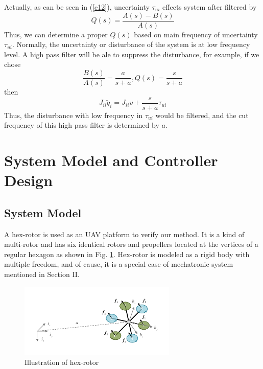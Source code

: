 \documentclass[letterpaper, 10 pt, conference]{ieeeconf}  %
\begin{document}
Actually, as can be seen in (\ref{e12}), uncertainty $\tau_{ui}$ effects system after filtered by
\begin{equation}
    Q(s) = \frac{A(s)-B(s)}{A(s)} 
    \label{e13}
\end{equation}
Thus, we can determine a proper $Q(s)$ based on main frequency of uncertainty $\tau_{ui}$.
Normally, the uncertainty or disturbance of the system is at low frequency level.
A high pass filter will be ale to suppress the disturbance, for example, if we chose
\begin{equation}
    \frac{B(s)}{A(s)} = \frac{a}{s+a}, Q(s) = \frac{s}{s+a} \label{e14}
\end{equation}
then
\begin{equation}
    J_{ii}\ddot{q}_i = J_{ii}v + \frac{s}{s+a}\tau_{ui} \label{e15}
\end{equation}
Thus, the disturbance with low frequency in $\tau_{ui}$ would be filtered, and the cut frequency of this high pass filter is determined by $a$.

\section{System Model and Controller Design}

\subsection{System Model}

A hex-rotor is used as an UAV platform to verify our method.
It is a kind of multi-rotor and has six identical rotors and propellers located at the vertices of a regular hexagon as shown in Fig. \ref{f5}.
Hex-rotor is modeled as a rigid body with multiple freedom, and of cause, it is a special case of mechatronic system mentioned in Section II.
\begin{figure}[t]
    \centering
    \includegraphics[width=2.95in]{illustrations/fig5.pdf}
    \caption{Illustration of hex-rotor}
    \label{f5}
\end{figure}
\end{document}
